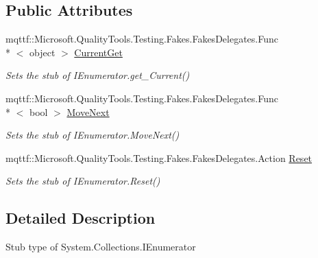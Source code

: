 \subsection*{Public Attributes}
\begin{DoxyCompactItemize}
\item 
mqttf\-::\-Microsoft.\-Quality\-Tools.\-Testing.\-Fakes.\-Fakes\-Delegates.\-Func\\*
$<$ object $>$ \hyperlink{class_system_1_1_collections_1_1_fakes_1_1_stub_i_enumerator_a225b0c653618468f46a9c86ffe6f5277}{Current\-Get}
\begin{DoxyCompactList}\small\item\em Sets the stub of I\-Enumerator.\-get\-\_\-\-Current()\end{DoxyCompactList}\item 
mqttf\-::\-Microsoft.\-Quality\-Tools.\-Testing.\-Fakes.\-Fakes\-Delegates.\-Func\\*
$<$ bool $>$ \hyperlink{class_system_1_1_collections_1_1_fakes_1_1_stub_i_enumerator_aaa94034c19c980ee57926099a8cb2529}{Move\-Next}
\begin{DoxyCompactList}\small\item\em Sets the stub of I\-Enumerator.\-Move\-Next()\end{DoxyCompactList}\item 
mqttf\-::\-Microsoft.\-Quality\-Tools.\-Testing.\-Fakes.\-Fakes\-Delegates.\-Action \hyperlink{class_system_1_1_collections_1_1_fakes_1_1_stub_i_enumerator_a275eb0c56a5aae49703766b0009e324e}{Reset}
\begin{DoxyCompactList}\small\item\em Sets the stub of I\-Enumerator.\-Reset()\end{DoxyCompactList}\end{DoxyCompactItemize}


\subsection{Detailed Description}
Stub type of System.\-Collections.\-I\-Enumerator



